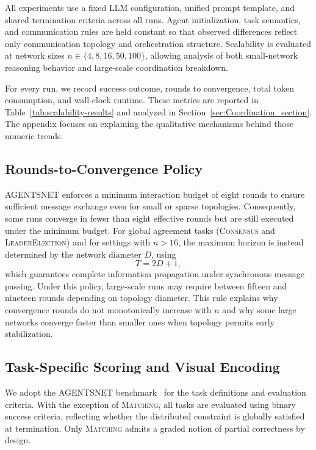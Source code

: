 All experiments use a fixed LLM configuration, unified prompt template, and shared termination criteria across all runs. Agent initialization, task semantics, and communication rules are held constant so that observed differences reflect only communication topology and orchestration structure. Scalability is evaluated at network sizes
\(n \in \{4, 8, 16, 50, 100\}\), allowing analysis of both small-network reasoning behavior and large-scale coordination breakdown.

For every run, we record success outcome, rounds to convergence, total token consumption, and wall-clock runtime. These metrics are reported in Table~\ref{tab:scalability-results} and analyzed in Section~\ref{sec:Coordination_section}. The appendix focuses on explaining the qualitative mechanisms behind those numeric trends.

\subsection{Rounds-to-Convergence Policy}
\label{appendix:rounds}

AGENTSNET enforces a minimum interaction budget of eight rounds to ensure sufficient message exchange even for small or sparse topologies. Consequently, some runs converge in fewer than eight effective rounds but are still executed under the minimum budget. For global agreement tasks (\textsc{Consensus} and \textsc{LeaderElection}) and for settings with \(n > 16\), the maximum horizon is instead determined by the network diameter \(D\), using
\[
T = 2D + 1,
\]
which guarantees complete information propagation under synchronous message passing. Under this policy, large-scale runs may require between fifteen and nineteen rounds depending on topology diameter. This rule explains why convergence rounds do not monotonically increase with \(n\) and why some large networks converge faster than smaller ones when topology permits early stabilization.

\subsection{Task-Specific Scoring and Visual Encoding}
\label{appendix:scoring}

We adopt the AGENTSNET benchmark~\cite{coordinationcollaborativereasoning} for the task definitions and evaluation criteria. With the exception of \textsc{Matching}, all tasks are evaluated using binary success criteria, reflecting whether the distributed constraint is globally satisfied at termination. Only \textsc{Matching} admits a graded notion of partial correctness by design.

